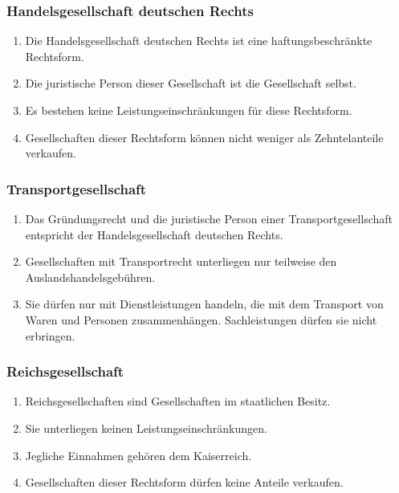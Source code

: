 \documentclass{article}
\begin{document}
\subsubsection{Handelsgesellschaft deutschen Rechts}\label{llc}
\begin{enumerate}[(1)]
    \item Die Handelsgesellschaft deutschen Rechts ist eine haftungsbeschränkte Rechtsform.
    \item Die juristische Person dieser Gesellschaft ist die Gesellschaft selbst.
    \item Es bestehen keine Leistungseinschränkungen für diese Rechtsform.
    \item Gesellschaften dieser Rechtsform können nicht weniger als Zehntelanteile verkaufen.
\end{enumerate}

\subsubsection{Transportgesellschaft}
\begin{enumerate}[(1)]
    \item Das Gründungsrecht und die juristische Person einer Transportgesellschaft entspricht der Handelsgesellschaft deutschen Rechts.
    \item Gesellschaften mit Transportrecht unterliegen nur teilweise den Auslandshandelsgebühren.
    \item Sie dürfen nur mit Dienstleistungen handeln, die mit dem Transport von Waren und Personen zusammenhängen. Sachleistungen dürfen sie nicht erbringen. 
\end{enumerate}

\subsubsection{Reichsgesellschaft}
\begin{enumerate}[(1)]
    \item Reichsgesellschaften sind Gesellschaften im staatlichen Besitz.
    \item Sie unterliegen keinen Leistungseinschränkungen.
    \item Jegliche Einnahmen gehören dem Kaiserreich.
    \item Gesellschaften dieser Rechtsform dürfen keine Anteile verkaufen.
\end{enumerate}
\end{document}
